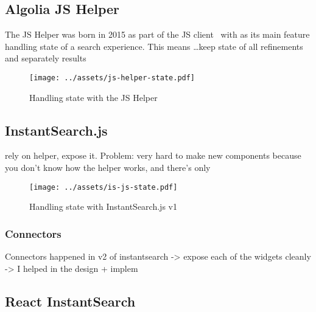\subsection{Algolia JS Helper} %
\label{sub:algolia_js_helper}

The JS Helper was born in 2015 as part of the JS client~\cite{algolia-blog-js-client} with as its main feature handling state of a search experience. This means \ldots keep state of all refinements and separately results

\begin{figure}[H]
\label{figure:js-helper-state}
  \centering
  \texttt{[image: ../assets/js-helper-state.pdf]}
  \caption{Handling state with the JS Helper}
\end{figure}


\subsection{InstantSearch.js} %
\label{sub:instantsearch_js}

rely on helper, expose it. Problem: very hard to make new components because you don't know how the helper works, and there's only 

\begin{figure}[H]
\label{figure:is-js-state}
  \centering
  \texttt{[image: ../assets/is-js-state.pdf]}
  \caption{Handling state with InstantSearch.js v1}
\end{figure}

\subsubsection{Connectors} %
\label{ssub:instantsearch_js_connectors}

Connectors happened in v2 of instantsearch
-> expose each of the widgets cleanly
-> I helped in the design + implem




\subsection{React InstantSearch} %
\label{sub:react_instantearch}

